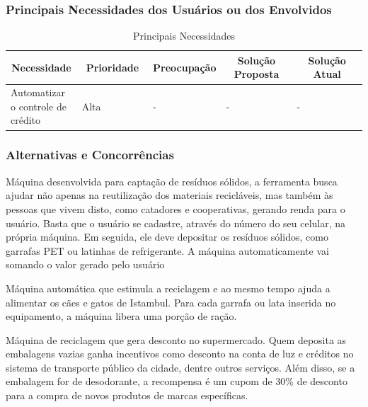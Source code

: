 \subsubsection{Principais Necessidades dos Usuários ou dos Envolvidos}

\begin{table}[htp]
    \centering
    \caption{Principais Necessidades}
    \label{my-label}
    \begin{tabular}{|p{0.20\linewidth}|p{0.20\linewidth}|p{0.20\linewidth}|p{0.20\linewidth}|p{0.20\linewidth}|}
    \hline
    \multicolumn{1}{|c|}{\textbf{Necessidade}} & \multicolumn{1}{c|}{\textbf{Prioridade}} & \multicolumn{1}{c|}{\textbf{Preocupação}} & \multicolumn{1}{c|}{\textbf{Solução Proposta}} & \multicolumn{1}{c|}{\textbf{Solução Atual}} \\ \hline
    Automatizar o controle de crédito          & Alta                                     & -                                         & -                                              & -                                           \\ \hline
    \end{tabular}
\end{table}

\subsubsection{Alternativas e Concorrências}

Máquina desenvolvida para captação de resíduos sólidos, a ferramenta busca ajudar não apenas na reutilização dos materiais recicláveis, mas também às pessoas que vivem disto, como catadores e cooperativas, gerando renda para o usuário. Basta que o usuário se cadastre, através do número do seu celular, na própria máquina. Em seguida, ele deve depositar os resíduos sólidos, como garrafas PET ou latinhas de refrigerante. A máquina automaticamente vai somando o valor gerado pelo usuário

Máquina automática que estimula a reciclagem e ao mesmo tempo ajuda a alimentar os cães e gatos de Istambul. Para cada garrafa ou lata inserida no equipamento, a máquina libera uma porção de ração.

Máquina de reciclagem que gera desconto no supermercado. Quem deposita as embalagens vazias ganha incentivos como desconto na conta de luz e créditos no sistema de transporte público da cidade, dentre outros serviços. Além disso, se a embalagem for de desodorante, a recompensa é um cupom de 30\% de desconto para a compra de novos produtos de marcas específicas.

